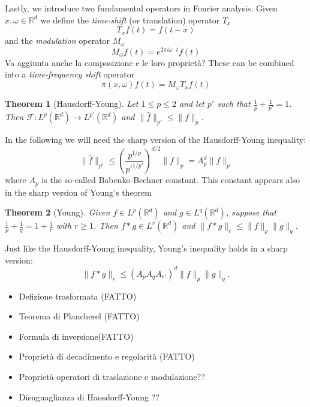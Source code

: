 \documentclass[corpo=11pt, stile=classica, tipotesi=custom,
greek, evenboxes, english]{toptesi}
\numberwithin{equation}{chapter}
\newtheorem{teo}{Theorem}[chapter] %
\newcommand{\R}{\mathbb{R}} %
\newcommand{\F}{\mathscr{F}} %
\begin{document}
Lastly, we introduce two fundamental operators in Fourier analysis. Given $x,\omega \in \R^d$ we define the \emph{time-shift} (or translation) operator $T_x$
\begin{equation}\label{time-shift operator def}
	T_x f(t) = f(t-x)
\end{equation}
and the \emph{modulation} operator $M_{\omega}$
\begin{equation}\label{modulation operator def}
	M_{\omega} f(t) = e^{2 \pi i \omega \cdot t} f(t)
\end{equation}
{\color{blue} Va aggiunta anche la composizione e le loro proprietà?}
These can be combined into a \emph{time-frequency shift} operator
\begin{equation}\label{time-frequency shift def}
	\pi(x,\omega) f(t) = M_{\omega} T_x f(t)
\end{equation}
{\color{blue}\begin{teo}[Hausdorff-Young]
	Let $1 \leq p \leq 2$ and let $p'$ such that $\frac{1}{p} + \frac{1}{p'} = 1$. Then $\F : L^p(\R^d) \rightarrow L^{p'}(\R^d)$ and $\| \hat{f }\|_{p'} \leq \| f \|_p$.
\end{teo}}
In the following we will need the sharp version of the Hausdorff-Young inequality: 
\begin{equation}\label{Hausdorff-Yound inequality}
	\| \hat{f} \|_{p'} \leq \left(\dfrac{p^{1/p}}{p'^{1/p'}}\right)^{d/2} \|f\|_p = A_p^d \|f\|_p
\end{equation}
where $A_p$ is the so-called Babenko-Bechner constant. This constant appears also in the sharp version of Young's theorem
\begin{teo}[Young]\label{Young theorem}
	Given $f \in L^p(\R^d)$ and $g \in L^q(\R^d)$, suppose that $\frac{1}{p}+\frac{1}{q}=1+\frac{1}{r}$ with $r \geq 1$. Then $f * g \in L^r(\R^d)$ and $\|f * g\|_r \leq \|f\|_p \|g\|_q$.
\end{teo}
Just like the Hausdorff-Young inequality, Young's inequality holds in a sharp version:
\begin{equation}\label{Young inequality sharp}
	\|f * g\|_r \leq (A_p A_q A_{r'})^d \|f\|_p \|g\|_q.
\end{equation}


	\begin{itemize}
		\item Defizione trasformata (FATTO)
		\item Teorema di Plancherel (FATTO)
		\item Formula di inversione(FATTO)
		\item Proprietà di decadimento e regolarità (FATTO)
		\item Proprietà operatori di traslazione e modulazione??
		\item Disuguaglianza di Hausdorff-Young ??
	\end{itemize}
\end{document}
